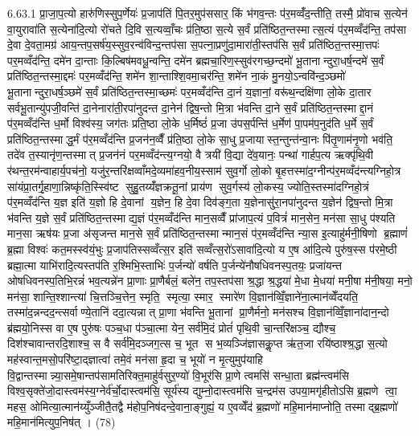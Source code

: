 6.63.1
प्रा॒जा॒प॒त्यो हारु॑णिस्सुप॒र्णेयः॑ प्र॒जाप॑तिं पि॒तर॒मुप॑ससार॒ किं भ॑गव॒न्तः प॑र॒मव्वँ॑द॒न्तीति॒ तस्मै॒ प्रो॑वाच स॒त्येन॑ वा॒युरावा॑ति स॒त्येना॑दि॒त्यो रो॑चते दि॒वि स॒त्यव्वाँ॒चः प्र॑ति॒ष्ठा स॒त्ये स॒र्वं प्रति॑ष्ठित॒न्तस्मात्स॒त्यं प॑र॒मव्वँद॑न्ति॒ तप॑सा दे॒वा दे॒वता॒मग्र॑ आय॒न्तप॒सर्\mbox{}ष॑य॒स्सुव॒रन्व॑विन्द॒न्तप॑सा स॒पत्ना॒प्रणु॑दा॒मारा॑ती॒स्तप॑सि स॒र्वं प्रति॑ष्ठित॒न्तस्मा॒त्तपः॑ पर॒मव्वँद॑न्ति॒ दमे॑न दा॒न्ताः कि॒ल्बिष॑मवधू॒न्वन्ति॒ दमे॑न ब्रह्मचा॒रिण॒स्सुव॑रगच्छ॒न्दमो॑ भू॒तानान्दुरा॒धर्\mbox{}ष॒न्दमे॑ स॒र्वं प्रति॑ष्ठित॒न्तस्मा॒द्दमः॑ पर॒मव्वँद॑न्ति॒ शमे॑न शा॒न्ताश्शि॒वमा॒चर॑न्ति॒ शमे॑न ना॒कं मु॒नयो॒ऽन्ववि॑न्द॒ञ्छमो॑ भू॒तानान्दुरा॒धर्\mbox{}ष॒ञ्छमे॑ स॒र्वं प्रति॑ष्ठित॒न्तस्मा॒च्छमः॑ पर॒मव्वँद॑न्ति दा॒नं य॒ज्ञानां॒ वरू॑थ॒न्दक्षि॑णा लो॒के दा॒तार सर्वभू॒तान्यु॑पजी॒वन्ति॑ दा॒नेनारा॑ती॒रपा॑नुदन्त दा॒नेन॑ द्विष॒न्तो मि॒त्रा भ॑वन्ति दा॒ने स॒र्वं प्रति॑ष्ठित॒न्तस्माद्दा॒नं प॑र॒मव्वँद॑न्ति ध॒र्मो विश्व॑स्य॒ जग॑तः प्रति॒ष्ठा लो॒के ध॒र्मिष्ठं॑ प्र॒जा उ॑पस॒र्पन्ति॑ ध॒र्मेण॑ पा॒पम॑प॒नुद॑ति ध॒र्मे स॒र्वं प्रति॑ष्ठित॒न्तस्माद्ध॒र्मं प॑र॒मव्वँद॑न्ति प्र॒जन॑न॒व्वैँ प्र॑ति॒ष्ठा लो॒के सा॒धु प्र॒जायास्त॒न्तुन्त॑न्वा॒नः पि॑तृ॒णाम॑नृ॒णो भव॑ति॒ तदे॑व त॒स्यानृ॑ण॒न्तस्मात् प्र॒जन॑नं पर॒मव्वँद॑न्त्य॒ग्नयो॒ वै त्रयी॑ वि॒द्या दे॑व॒यानः॒ पन्था॑ गार्\mbox{}हप॒त्य ऋक्पृ॑थि॒वी र॑थन्त॒रम॑न्वाहार्य॒पच॑नो॒ यजु॑र॒न्तरि॑क्षव्वाँमदे॒व्यमा॑हव॒नीय॒स्साम॑ सुव॒र्गो लो॒को बृ॒हत्तस्मा॑द॒ग्नीन्प॑र॒मव्वँद॑न्त्यग्निहो॒त्र सा॑यंप्रा॒तर्गृ॒हाणा॒न्निष्कृ॑ति॒स्स्वि॑ष्ट सुहु॒तय्यँ॑ज्ञक्रतू॒नां प्राय॑ण सुव॒र्गस्य॑ लो॒कस्य॒ ज्योति॒स्तस्मा॑दग्निहो॒त्रं प॑र॒मव्वँद॑न्ति य॒ज्ञ इति॑ य॒ज्ञो हि दे॒वानां य॒ज्ञेन॒ हि दे॒वा दिव॑ङ्ग॒ता य॒ज्ञेनासु॑रा॒नपा॑नुदन्त य॒ज्ञेन॑ द्विष॒न्तो मि॒त्रा भ॑वन्ति य॒ज्ञे स॒र्वं प्रति॑ष्ठित॒न्तस्माद्य॒ज्ञं प॑र॒मव्वँद॑न्ति मान॒सव्वैँ प्रा॑जाप॒त्यं प॒वित्रं॑ मान॒सेन॒ मन॑सा सा॒धु प॑श्यति मान॒सा ऋष॑यः प्र॒जा अ॑सृजन्त मान॒से स॒र्वं प्रति॑ष्ठित॒न्तस्मान्मान॒सं प॑र॒मव्वँद॑न्ति न्या॒स इ॒त्याहु॑र्मनी॒षिणो ब्र॒ह्माणं॑ ब्र॒ह्मा विश्वः॑ कत॒मस्स्व॑यं॒भुः प्र॒जाप॑तिस्सव्वँत्स॒र इति॑ सव्वँत्स॒रो॑ऽसावा॑दि॒त्यो य ए॒ष आ॑दि॒त्ये पुरु॑ष॒स्स प॑रमे॒ष्ठी ब्रह्मा॒त्मा याभि॑रादि॒त्यस्तप॑ति र॒श्मिभि॒स्ताभिः॑ प॒र्जन्यो॑ वर्\mbox{}षति प॒र्जन्ये॑नौषधिवनस्प॒तयः॒ प्रजा॑यन्त ओषधिवनस्प॒तिभि॒रन्नं॑ भव॒त्यन्ने॑न प्रा॒णाः प्रा॒णैर्बलं॒ बले॑न॒ तप॒स्तप॑सा श्र॒द्धा श्र॒द्धया॑ मे॒धा मे॒धया॑ मनी॒षा म॑नी॒षया॒ मनो॒ मन॑सा॒ शान्ति॒श्शान्त्या॑ चि॒त्तञ्चि॒त्तेन॒ स्मृति॒ स्मृत्या॒ स्मार॒ स्मारे॑ण वि॒ज्ञान॑व्विँ॒ज्ञाने॑ना॒त्मान॑व्वेँदयति॒ तस्मा॑द॒न्नन्दद॒न्त्सर्वाण्ये॒तानि॑ ददा॒त्यन्नात् प्रा॒णा भ॑वन्ति भू॒तानां प्रा॒णैर्मनो॒ मन॑सश्च वि॒ज्ञान॑व्विँ॒ज्ञाना॑दान॒न्दो ब्र॑ह्मयो॒निस्स वा ए॒ष पुरु॑षः पञ्च॒धा प॑ञ्चा॒त्मा येन॒ सर्व॑मि॒दं प्रोतं॑ पृथि॒वी चा॒न्तरि॑क्षञ्च॒ द्यौश्च॒ दिश॑श्चावान्तरदि॒शाश्च॒ स वै सर्व॑मि॒दञ्जग॒त्स च॒ भूत स भ॒व्यञ्जि॑ज्ञासकॢ॒प्त ऋ॑त॒जा रयि॑ष्ठाश्श्र॒द्धा स॒त्यो मह॑स्वान्त॒मसो॒परि॑ष्टा॒द्ज्ञात्वा॑ तमे॒वं मन॑सा हृ॒दा च॒ भूयो॑ न मृ॒त्युमुप॑याहि वि॒द्वान्तस्मान्न्या॒समे॒षान्तप॑सामतिरिक्त॒माहु॑र्वसुर॒ण्यो॑ वि॒भूर॑सि प्रा॒णे त्वमसि॑ सन्धा॒ता ब्रह्म॑न्त्वम॑सि विश्व॒सृक्ते॑जो॒दास्त्वम॑स्य॒ग्नेर्व॑र्चो॒दास्त्वम॑सि॒ सूर्य॑स्य द्युम्नो॒दास्त्वम॑सि च॒न्द्रम॑स उपया॒मगृ॑हीतोऽसि ब्र॒ह्मणे त्वा॒ महस॒ ओमित्या॒त्मान॑य्युँञ्जीतै॒तद्वै म॑होप॒निष॑दन्दे॒वाना॒ङ्गुह्यं॒ य ए॒वव्वेँद॑ ब्र॒ह्मणो॑ महि॒मान॑माप्नोति॒ तस्माद्ब्र॒ह्मणो॑ महि॒मान॑मित्युप॒निष॑त् । (78)
\anuvakamend

